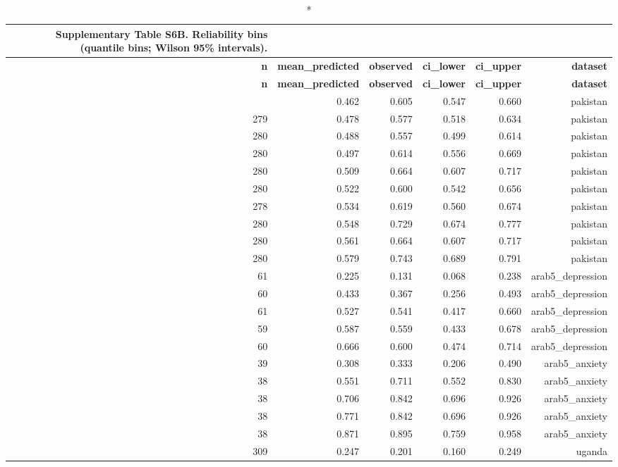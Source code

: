 \documentclass[10pt]{article}
\begin{document}
\tiny
\setlength{\tabcolsep}{2pt}
\begin{longtable}{rrrrrr}
\caption*{\textbf{Supplementary Table S6B.} Reliability bins (quantile bins; Wilson 95\% intervals).}\\
\toprule
\textbf{n} & \textbf{mean\_predicted} & \textbf{observed} & \textbf{ci\_lower} & \textbf{ci\_upper} & \textbf{dataset} \\
\midrule
\endfirsthead
\toprule
\textbf{n} & \textbf{mean\_predicted} & \textbf{observed} & \textbf{ci\_lower} & \textbf{ci\_upper} & \textbf{dataset} \\
\midrule
\endhead
\bottomrule
\endfoot
281 & 0.462 & 0.605 & 0.547 & 0.660 & pakistan \\
279 & 0.478 & 0.577 & 0.518 & 0.634 & pakistan \\
280 & 0.488 & 0.557 & 0.499 & 0.614 & pakistan \\
280 & 0.497 & 0.614 & 0.556 & 0.669 & pakistan \\
280 & 0.509 & 0.664 & 0.607 & 0.717 & pakistan \\
280 & 0.522 & 0.600 & 0.542 & 0.656 & pakistan \\
278 & 0.534 & 0.619 & 0.560 & 0.674 & pakistan \\
280 & 0.548 & 0.729 & 0.674 & 0.777 & pakistan \\
280 & 0.561 & 0.664 & 0.607 & 0.717 & pakistan \\
280 & 0.579 & 0.743 & 0.689 & 0.791 & pakistan \\
61 & 0.225 & 0.131 & 0.068 & 0.238 & arab5\_depression \\
60 & 0.433 & 0.367 & 0.256 & 0.493 & arab5\_depression \\
61 & 0.527 & 0.541 & 0.417 & 0.660 & arab5\_depression \\
59 & 0.587 & 0.559 & 0.433 & 0.678 & arab5\_depression \\
60 & 0.666 & 0.600 & 0.474 & 0.714 & arab5\_depression \\
39 & 0.308 & 0.333 & 0.206 & 0.490 & arab5\_anxiety \\
38 & 0.551 & 0.711 & 0.552 & 0.830 & arab5\_anxiety \\
38 & 0.706 & 0.842 & 0.696 & 0.926 & arab5\_anxiety \\
38 & 0.771 & 0.842 & 0.696 & 0.926 & arab5\_anxiety \\
38 & 0.871 & 0.895 & 0.759 & 0.958 & arab5\_anxiety \\
309 & 0.247 & 0.201 & 0.160 & 0.249 & uganda \\

\end{longtable}
\end{document}
